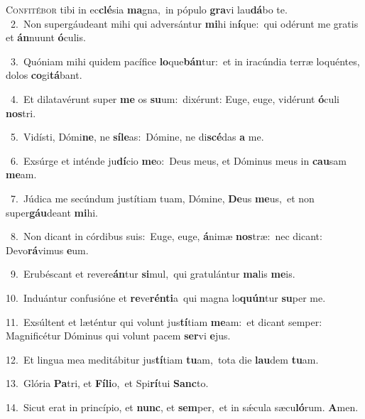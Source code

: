 \lettrine{\initial\textcolor{\initialcolor}{C}}{onfitébor} tibi in ec\-\textbf{clé}\-sia \textbf{ma}\-gna,~\star in pópulo \textbf{gra}\-vi lau\-\textbf{dá}\-bo te.\\
{\numbfont\textcolor{\numbcolor}{~2.}}~Non supergáudeant mihi qui adversántur \textbf{mi}\-hi in\-\textbf{í}\-que:~\star qui odérunt me gratis et \textbf{án}\-nuunt \textbf{ó}\-culis.\par
{\numbfont\textcolor{\numbcolor}{~3.}}~Quóniam mihi quidem pacífice \textbf{lo}\-que\-\textbf{bán}\-tur:~\star et in iracúndia terræ loquéntes, dolos \textbf{co}\-gi\-\textbf{tá}\-bant.\par
{\numbfont\textcolor{\numbcolor}{~4.}}~Et dilatavérunt super \textbf{me} os \textbf{su}\-um:~\star dixérunt: Euge, euge, vidérunt \textbf{ó}\-culi \textbf{nos}\-tri.\par
{\numbfont\textcolor{\numbcolor}{~5.}}~Vidísti, Dómi\-\textbf{ne}\-, ne \textbf{sí}\-\textbf{le}as:~\star Dómine, ne di\-\textbf{scé}\-das \textbf{a} me.\par
{\numbfont\textcolor{\numbcolor}{~6.}}~Exsúrge et inténde ju\-\textbf{dí}\-cio \textbf{me}\-o:~\star Deus meus, et Dóminus meus in \textbf{cau}\-sam \textbf{me}\-am.\par
{\numbfont\textcolor{\numbcolor}{~7.}}~Júdica me secúndum justítiam tuam, Dómine, \textbf{De}\-us \textbf{me}\-us,~\star et non super\-\textbf{gáu}\-deant \textbf{mi}\-hi.\par
{\numbfont\textcolor{\numbcolor}{~8.}}~Non dicant in córdibus suis:~\dagger Euge, euge, \textbf{á}\-nimæ \textbf{nos}\-træ:~\star nec dicant: Devo\-\textbf{rá}\-vimus \textbf{e}\-um.\par
{\numbfont\textcolor{\numbcolor}{~9.}}~Erubéscant et revere\-\textbf{án}\-tur \textbf{si}\-mul,~\star qui gratulántur \textbf{ma}\-lis \textbf{me}\-is.\par
{\numbfont\textcolor{\numbcolor}{10.}}~Induántur confusióne et \textbf{re}\-ve\-\textbf{rén}\-\textbf{ti}a~\star qui magna lo\-\textbf{quún}\-tur \textbf{su}\-per me.\par
{\numbfont\textcolor{\numbcolor}{11.}}~Exsúltent et læténtur qui volunt jus\-\textbf{tí}\-tiam \textbf{me}\-am:~\star et dicant semper: Magnificétur Dóminus qui volunt pacem \textbf{ser}\-vi \textbf{e}\-jus.\par
{\numbfont\textcolor{\numbcolor}{12.}}~Et lingua mea meditábitur jus\-\textbf{tí}\-tiam \textbf{tu}\-am,~\star tota die \textbf{lau}\-dem \textbf{tu}\-am.\par
{\numbfont\textcolor{\numbcolor}{13.}}~Glória \textbf{Pa}\-tri, et \textbf{Fí}\-\textbf{li}o,~\star et Spi\-\textbf{rí}\-tui \textbf{Sanc}\-to.\par
{\numbfont\textcolor{\numbcolor}{14.}}~Sicut erat in princípio, et \textbf{nunc}\-, et \textbf{sem}\-per,~\star et in sǽcula sæcu\-\textbf{ló}\-rum. \textbf{A}\-men.\par
